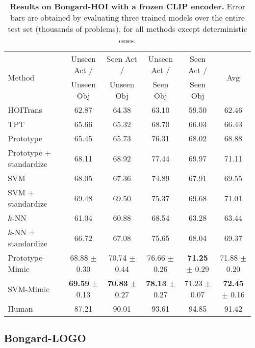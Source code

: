 \begin{table*}
  \centering
    \begin{tabular}{lccccc}
    \toprule
    \multirow{2}{*}{Method} & Unseen Act / & Seen Act / & Unseen Act / & Seen Act /  & \multirow{2}{*}{Avg} \\
    & Unseen Obj & Unseen Obj & Seen Obj & Seen Obj & \\
    \midrule
    HOITrans~\cite{zou2021endtoend} &  62.87  &  64.38  &  63.10  &  59.50  &  62.46  \\
    TPT~\cite{shu2022testtime} &  65.66  &  65.32  &  68.70  &  66.03  &  66.43  \\
    \midrule
    Prototype &  65.45  &  65.73  &  76.31  &  68.02  &  68.88  \\
    Prototype + standardize &  68.11  &  68.92  &  77.44  &  69.97  &  71.11  \\
    SVM & 68.05 & 67.36 & 74.89 & 67.91 & 69.55 \\
    SVM + standardize & 69.48 & 69.50 & 75.37 & 69.68 & 71.01 \\
    $k$-NN & 61.04 & 60.88 & 68.54 & 63.28 & 63.44 \\
    $k$-NN + standardize & 66.72 & 67.08 & 75.65 & 68.04 & 69.37 \\
    Prototype-Mimic&   68.88 $\pm$ 0.30 & 70.74 $\pm$ 0.44 & 76.66 $\pm$ 0.26 & \textbf{71.25} $\pm$ 0.29 & 71.88 $\pm$ 0.20 \\
    SVM-Mimic & \textbf{69.59} $\pm$ 0.13 & \textbf{70.83} $\pm$ 0.27 & \textbf{78.13} $\pm$ 0.27 & 71.23 $\pm$ 0.07 & \textbf{72.45} $\pm$ 0.16 \\
    \midrule
    Human~\cite{jiang2023bongardhoi} &  87.21  &  90.01  &  93.61  &  94.85  &  91.42  \\
    \bottomrule
  \end{tabular}
    \caption{\textbf{Results on Bongard-HOI with a frozen CLIP encoder.}
    Error bars are obtained by evaluating three trained models over the entire test set (thousands of problems), for all methods except deterministic ones.}
    \label{tab:hoi-table}
\end{table*}

\subsection{Bongard-LOGO}
